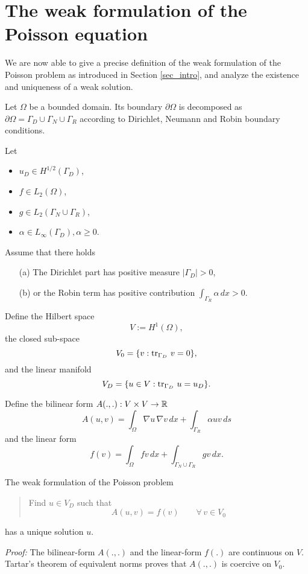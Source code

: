 \section{The weak formulation of the Poisson equation}

We are now able to give a precise definition of the weak formulation
of the Poisson problem as introduced in Section \ref{sec_intro}, and analyze the 
existence and uniqueness of a weak solution. 

Let $\Omega$ be a  bounded domain. Its boundary $\partial \Omega$ is 
decomposed as $\partial \Omega = \Gamma_D \cup \Gamma_N \cup \Gamma_R$ according to Dirichlet, Neumann and Robin boundary conditions. 

Let
\begin{itemize}
\item 
 $u_D \in H^{1/2}(\Gamma_D)$, 
\item
$f \in L_2(\Omega)$,
\item
$g \in L_2(\Gamma_N \cup \Gamma_R)$,
\item
$\alpha \in L_\infty(\Gamma_D), \alpha \geq 0$. 
\end{itemize}



Assume that there holds 
\begin{enumerate}
\item[(a)] The Dirichlet part has positive measure $| \Gamma_D | > 0$,
\item[(b)] or the Robin term has positive contribution $\int_{\Gamma_R} \alpha \, dx > 0$.
\end{enumerate}

Define the Hilbert space
$$
V := H^1(\Omega),
$$
the closed sub-space 
$$
V_0 = \{ v : \operatorname{tr}_{\Gamma_D} \, v = 0 \},
$$
and the linear manifold 
$$
V_D = \{ u \in V : \operatorname{tr}_{\Gamma_D} \, u = u_D \}.
$$

Define the bilinear form $A(.,.) : V \times V \rightarrow {\mathbb R}$
$$
A(u,v) = \int_\Omega \nabla u \, \nabla v \, dx + \int_{\Gamma_R} \alpha u v \, ds 
$$
and the linear form
$$
f(v) = \int_\Omega f v \, dx + \int_{\Gamma_N \cup \Gamma_R} g v \, dx.
$$

\begin{theorem}
The weak formulation of the Poisson problem
\begin{quote}
Find $u \in V_D$ such that
\begin{equation} \label{equ_weakform}
A(u,v) = f(v) \qquad \forall \, v \in V_0
\end{equation}
\end{quote}
has a unique solution $u$.
\end{theorem}
{\em Proof:} 
The bilinear-form $A(.,.)$ and the linear-form $f(.)$ are continuous
on $V$. Tartar's theorem of equivalent norms proves that $A(.,.)$ is coercive
on $V_0$.


